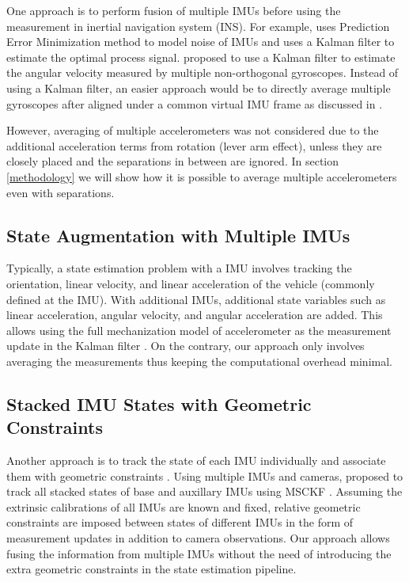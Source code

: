 \documentclass[conference]{IEEEtran}
\begin{document}
One approach is to perform fusion of multiple IMUs before using the measurement in inertial navigation system (INS). For example, \cite{jafari2014_PEM} uses Prediction Error Minimization method to model noise of IMUs and uses a Kalman filter to estimate the optimal process signal. \cite{xue2023} proposed to use a Kalman filter to estimate the angular velocity measured by multiple non-orthogonal gyroscopes. Instead of using a Kalman filter, an easier approach would be to directly average multiple gyroscopes after aligned under a common virtual IMU frame as discussed in \cite{waegli2008, patel2022_multi-imu, Colomina2004REDUNDANTIF}.

However, averaging of multiple accelerometers was not considered due to the additional acceleration terms from rotation (lever arm effect), unless they are closely placed and the separations in between are ignored. In section \ref{methodology} we will show how it is possible to average multiple accelerometers even with separations.

\subsection{State Augmentation with Multiple IMUs}\label{augmented}

Typically, a state estimation problem with a IMU involves tracking the orientation, linear velocity, and linear acceleration of the vehicle (commonly defined at the IMU). With additional IMUs, additional state variables such as linear acceleration, angular velocity, and angular acceleration are added. This allows using the full mechanization model of accelerometer as the measurement update in the Kalman filter \cite{Bancroft2011DataFA, Beaudoin2018_satelite}. On the contrary, our approach only involves averaging the measurements thus keeping the computational overhead minimal.

\subsection{Stacked IMU States with Geometric Constraints}\label{constraint}

Another approach is to track the state of each IMU individually and associate them with geometric constraints \cite{waegli2008, Beaudoin2018_satelite}. Using multiple IMUs and cameras, \cite{Eckenhoff2021_MIMC-VINS} proposed to track all stacked states of base and auxillary IMUs using MSCKF \cite{Anastasios2007_MSCKF}. Assuming the extrinsic calibrations of all IMUs are known and fixed, relative geometric constraints are imposed between states of different IMUs in the form of measurement updates in addition to camera observations. Our approach allows fusing the information from multiple IMUs without the need of introducing the extra geometric constraints in the state estimation pipeline.
\end{document}
